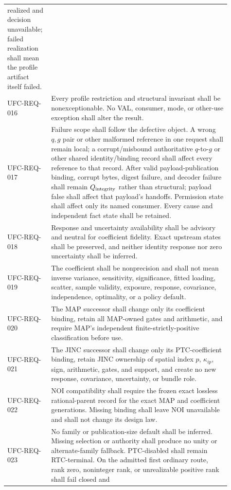 \begin{longtable}{p{0.15\linewidth}p{0.76\linewidth}}
realized and decision unavailable; failed realization shall mean the profile
artifact itself failed.\\
UFC-REQ-016 & Every profile restriction and structural invariant shall be
nonexceptionable. No VAL, consumer, mode, or other-use exception shall alter
the result.\\
UFC-REQ-017 & Failure scope shall follow the defective object. A wrong
\(q,g\) pair or other malformed reference in one request shall remain local;
a corrupt/misbound authoritative \(q\)-to-\(g\) or other shared
identity/binding record shall affect every reference to that record. After
valid payload-publication binding, corrupt bytes, digest failure, and decoder
failure shall remain \(Q_{\rm integrity}\) rather than structural; payload
false shall affect that payload's handoffs. Permission state shall affect only
its named consumer. Every cause and independent fact state shall be retained.\\
UFC-REQ-018 & Response and uncertainty availability shall be advisory and
neutral for coefficient fidelity. Exact upstream states shall be preserved,
and neither identity response nor zero uncertainty shall be inferred.\\
UFC-REQ-019 & The coefficient shall be nonprecision and shall not mean inverse
variance, sensitivity, significance, fitted loading, scatter, sample validity,
exposure, response, covariance, independence, optimality, or a policy
default.\\
UFC-REQ-020 & The MAP successor shall change only its coefficient binding,
retain all MAP-owned gates and arithmetic, and require MAP's independent
finite-strictly-positive classification before use.\\
UFC-REQ-021 & The JINC successor shall change only its PTC-coefficient binding,
retain JINC ownership of spatial index \(p\), \(\kappa_{ip}\), sign,
arithmetic, gates, and support, and create no new response, covariance,
uncertainty, or bundle role.\\
UFC-REQ-022 & NOI compatibility shall require the frozen exact lossless
rational-parent record for the exact MAP and coefficient generations. Missing
binding shall leave NOI unavailable and shall not change its design law.\\
UFC-REQ-023 & No family or publication-size default shall be inferred. Missing
selection or authority shall produce no unity or alternate-family fallback.
PTC-disabled shall remain RTC-terminal. On the admitted first ordinary route,
rank zero, noninteger rank, or unrealizable positive rank shall fail closed and

\end{longtable}
